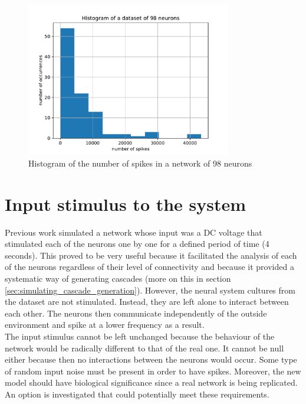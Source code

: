 \begin{figure}[H]
	\centering
	\includegraphics[width=0.8\textwidth]{histogram_number_spikes_dataset.pdf}
	\caption{Histogram of the number of spikes in a network of 98 neurons}
	\label{fig:histogram_spikes}
\end{figure}

\section{Input stimulus to the system}

Previous work \cite{alexandru2018estimating} simulated a network whose input was a DC voltage that stimulated each of the neurons one by one for a defined period of time (4 seconds). This proved to be very useful because it facilitated the analysis of each of the neurons regardless of their level of connectivity and because it provided a systematic way of generating cascades (more on this in section \ref{sec:simulating_cascade_generation}).
However, the neural system cultures from the dataset are not stimulated. Instead, they are left alone to interact between each other. The neurons then communicate independently of the outside environment and spike at a lower frequency as a result. \\

The input stimulus cannot be left unchanged because the behaviour of the network would be radically different to that of the real one. It cannot be null either because then no interactions between the neurons would occur. Some type of random input noise must be present in order to have spikes. Moreover, the new model should have biological significance since a real network is being replicated. An option is investigated that could potentially meet these requirements.\\

